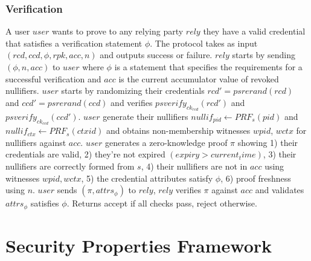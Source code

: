 \subsubsection{Verification}
A user $user$ wants to prove to any relying party $rely$ they have a valid credential that satisfies a verification statement $\phi$.
The protocol takes as input $(rcd, ccd, \phi, rpk, acc, n)$ and outputs success or failure.
$rely$ starts by sending $(\phi, n, acc)$ to $user$ where $\phi$ is a statement that specifies the requirements for a successful verification and $acc$ is the current accumulator value of revoked nullifiers.
$user$ starts by randomizing their credentials $rcd' = psrerand(rcd)$ and $ccd' = psrerand(ccd)$ and verifies $psverify_{ck_{rcd}}(rcd')$ and $psverify_{ck_{ccd}}(ccd')$. $user$ generate their nullifiers $nullif_{pid} \gets PRF_s(pid)$ and $nullif_{ctx} \gets PRF_s(ctxid)$ and obtains non-membership witnesses $wpid$, $wctx$ for nullifiers against $acc$.
$user$ generates a zero-knowledge proof $\pi$ showing 1) their credentials are valid, 2) they're not expired $(expiry > current_time)$, 3) their nullifiers are correctly formed from $s$, 4) their nullifiers are not in $acc$ using witnesses $wpid, wctx$, 5) the credential attributes satisfy $\phi$, 6) proof freshness using $n$.
$user$ sends $(\pi, attrs_{\phi})$ to $rely$, $rely$ verifies $\pi$ against $acc$ and validates $attrs_{\phi}$ satisfies $\phi$. Returns accept if all checks pass, reject otherwise.












\newpage
\section{Security Properties Framework}\label{new-sec-properties}
